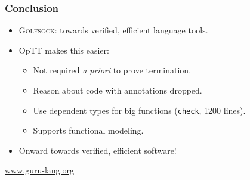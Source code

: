 \documentclass[11pt]{beamer}
\begin{document}
\begin{frame}
\frametitle{Conclusion}
\begin{itemize}
\item \textsc{Golfsock}: towards verified, efficient language tools.
\item OpTT makes this easier:
\begin{itemize}
\item Not required \emph{a priori} to prove termination.
\item Reason about code with annotations dropped.
\item Use dependent types for big functions (\texttt{check}, 1200 lines).
\item Supports functional modeling.
\end{itemize}

\item Onward towards verified, efficient software!
\end{itemize}

\begin{center}
\large
\textcolor{blue}{\url{www.guru-lang.org}}
\end{center}

\end{frame}
\end{document}
